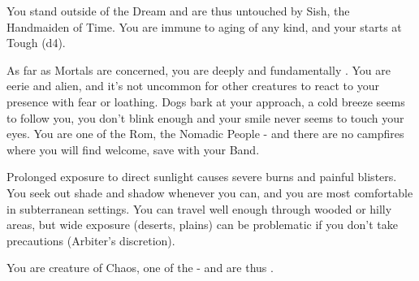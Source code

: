 \begin{multicols*}{2}

  You stand outside of the Dream and are thus untouched by Sish, the Handmaiden of Time. You are immune to aging of any kind, and your \DEATH starts at Tough (d4).

\newpage




  As far as Mortals are concerned, you are deeply and fundamentally . You are eerie and alien, and it's not uncommon for other creatures to react to your presence with fear or loathing. Dogs bark at your approach, a cold breeze seems to follow you, you don't blink enough and your smile never seems to touch your eyes. You are one of the Rom, the Nomadic People - and there are no campfires where you will find welcome, save with your Band.




  Prolonged exposure to direct sunlight causes severe burns and painful blisters.  You seek out shade and shadow whenever you can, and you are most comfortable in subterranean settings.  You can travel well enough through wooded or hilly areas, but wide exposure (deserts, plains) can be problematic if you don't take precautions (Arbiter's discretion).

    
  You are creature of Chaos, one of the  - and are thus .

\cbreak



\end{multicols*}
